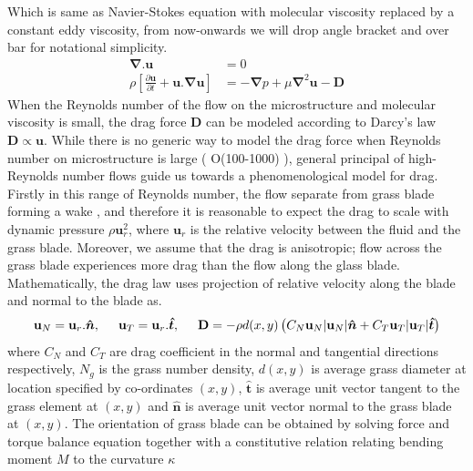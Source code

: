 \documentclass[12pt]{report}   %
\newcommand{\bn}{{\boldsymbol{\hat{n}}}}
\newcommand{\bt}{{\boldsymbol{\hat{t}}}}
\newcommand{\bu}{\mathbf{u}}
\newcommand{\grad}{\mathbf{\nabla}}
\begin{document}
Which is same as Navier-Stokes equation with molecular viscosity replaced by a constant eddy viscosity, from now-onwards we will drop angle bracket and over bar 
for notational simplicity.
\begin{equation}\label{averaged_eq}
\begin{split}
  \grad .{\bu}&=0 \\
 \rho \left[ \frac{\partial {\bu}  }{\partial t}+  {\bu} . \grad \bu  \right ] &= - \grad{p}  +\mu \grad^2\bu - \mathbf{D}
\end{split}
\end{equation}
When the Reynolds number of the flow on the microstructure and molecular viscosity is small, the drag force $\mathbf{D}$ can be modeled according to Darcy's law $\mathbf{D} \propto \bu$. While there is no generic way to model the drag force when Reynolds number on microstructure is large ( O(100-1000) ), general principal of high-Reynolds number flows guide us towards a phenomenological model for drag. Firstly in this range of Reynolds number, the flow separate from grass blade forming a wake , and therefore it is reasonable to expect the drag to scale with dynamic pressure $\rho \bu_r^2$, where $\bu_r$ is the relative velocity between the fluid and the grass blade. Moreover, we assume that the drag is anisotropic; flow across the grass blade experiences more drag than the flow along the glass blade. Mathematically, the drag law uses projection of relative velocity along the blade and normal to the blade as.
\begin{equation}
 \bu_N = \bu_r.\bn,\hspace{0.5cm} \bu_T = \bu_r.\bt,\hspace{.5cm} \mathbf{D} = -\rho d(x,y)\left( C_N \bu_N |\bu_N|\bn + C_T \bu_T |\bu_T| \bt \right)
\end{equation} 
where $C_N$ and $C_T$ are drag coefficient in the normal and tangential directions respectively, $N_g$ is the grass number density, $d(x,y)$ is average grass diameter at location specified by co-ordinates $(x,y)$, $\bt$ is average unit vector tangent to the grass element at $(x,y)$ and $\bn$ is average unit vector normal to the grass blade at $(x,y)$. The orientation of grass blade can be obtained by solving force and torque balance equation together with a constitutive relation relating bending moment $M$ to the curvature $\kappa$
\end{document}
